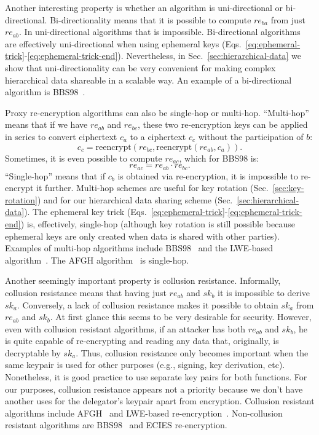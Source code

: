 \documentclass[longbibliography,nofootinbib]{revtex4-1}
\begin{document}
\begin{CJK*}{UTF8}{gbsn}
Another interesting property is whether an algorithm is uni-directional or bi-directional.
Bi-directionality means that it is possible to compute $re_{ba}$ from just $re_{ab}$.
In uni-directional algorithms that is impossible.
Bi-directional algorithms are effectively uni-directional when using ephemeral keys
(Eqs.~\ref{eq:ephemeral-trick}-\ref{eq:ephemeral-trick-end}).
Nevertheless, in Sec.~\ref{sec:hierarchical-data} we show that uni-directionality can be very convenient for making complex hierarchical data shareable in a
scalable way.
An example of a bi-directional algorithm is BBS98~\cite{BBS98}.

Proxy re-encryption algorithms can also be single-hop or multi-hop.
``Multi-hop'' means that if we have $re_{ab}$ and $re_{bc}$, these two re-encryption keys can be applied in series to convert ciphertext $c_a$ to a ciphertext
$c_c$ without the participation of $b$:
\begin{equation}
    c_c = \text{reencrypt}(re_{bc}, \text{reencrypt}(re_{ab}, c_a)).
\end{equation}
Sometimes, it is even possible to compute $re_{ac}$, which for BBS98 is:
\begin{equation}
    re_{ac} = re_{ab} \cdot re_{bc}.
\end{equation}
``Single-hop'' means that if $c_b$ is obtained via re-encryption, it is impossible to re-encrypt it further.
Multi-hop schemes are useful for key rotation (Sec.~\ref{sec:key-rotation}) and for our hierarchical data sharing scheme (Sec.~\ref{sec:hierarchical-data}).
The ephemeral key trick (Eqs.~\ref{eq:ephemeral-trick}-\ref{eq:ephemeral-trick-end}) is, effectively, single-hop
(although key rotation is still possible because ephemeral keys are only created when data is shared with other parties).
Examples of multi-hop algorithms include BBS98~\cite{BBS98} and the LWE-based algorithm~\cite{lwe-reencryption}.
The AFGH algorithm~\cite{AFGH} is single-hop.

Another seemingly important property is collusion resistance.
Informally, collusion resistance means that having just $re_{ab}$ and $sk_b$ it is impossible to derive $sk_a$.
Conversely, a lack of collusion resistance makes it possible to obtain $sk_a$ from $re_{ab}$ and $sk_b$.
At first glance this seems to be very desirable for security.
However, even with collusion resistant algorithms, if an attacker has both $re_{ab}$ and $sk_b$, he is quite capable of re-encrypting and reading any data that, originally, is decryptable by $sk_a$.
Thus, collusion resistance only becomes important when the same keypair is used for other purposes (e.g., signing, key derivation, etc). Nonetheless, it is good practice to use separate key pairs for both functions.
For our purposes, collusion resistance appears not a priority because we don't have another uses for the delegator's keypair apart from encryption. %
Collusion resistant algorithms include AFGH~\cite{AFGH} and LWE-based re-encryption~\cite{lwe-reencryption}.
Non-collusion resistant algorithms are BBS98~\cite{BBS98} and ECIES re-encryption.


\end{CJK*}
\end{document}
